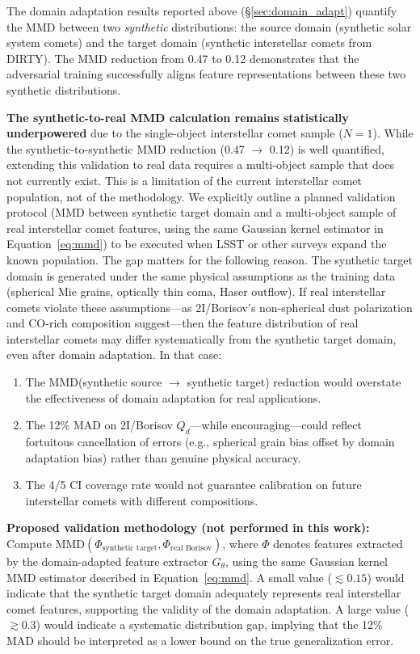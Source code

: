 \documentclass[preprint2]{aastex631}
\begin{document}
The domain adaptation results reported above (\S\ref{sec:domain_adapt}) quantify the MMD between two \textit{synthetic} distributions: the source domain (synthetic solar system comets) and the target domain (synthetic interstellar comets from DIRTY). The MMD reduction from 0.47 to 0.12 demonstrates that the adversarial training successfully aligns feature representations between these two synthetic distributions.

\textbf{The synthetic-to-real MMD calculation remains statistically underpowered} due to the single-object interstellar comet sample ($N=1$). While the synthetic-to-synthetic MMD reduction (0.47 $\to$ 0.12) is well quantified, extending this validation to real data requires a multi-object sample that does not currently exist. This is a limitation of the current interstellar comet population, not of the methodology. We explicitly outline a planned validation protocol (MMD between synthetic target domain and a multi-object sample of real interstellar comet features, using the same Gaussian kernel estimator in Equation~\ref{eq:mmd}) to be executed when LSST or other surveys expand the known population. The gap matters for the following reason. The synthetic target domain is generated under the same physical assumptions as the training data (spherical Mie grains, optically thin coma, Haser outflow). If real interstellar comets violate these assumptions---as 2I/Borisov's non-spherical dust polarization \citep{bagnulo22} and CO-rich composition \citep{bodewits20} suggest---then the feature distribution of real interstellar comets may differ systematically from the synthetic target domain, even after domain adaptation. In that case:

\begin{enumerate}
    \item The MMD(synthetic source $\to$ synthetic target) reduction would overstate the effectiveness of domain adaptation for real applications.
    \item The 12\% MAD on 2I/Borisov $Q_d$---while encouraging---could reflect fortuitous cancellation of errors (e.g., spherical grain bias offset by domain adaptation bias) rather than genuine physical accuracy.
    \item The 4/5 CI coverage rate would not guarantee calibration on future interstellar comets with different compositions.
\end{enumerate}

\textbf{Proposed validation methodology (not performed in this work):} Compute $\text{MMD}(\Phi_{\text{synthetic target}}, \Phi_{\text{real Borisov}})$, where $\Phi$ denotes features extracted by the domain-adapted feature extractor $G_\theta$, using the same Gaussian kernel MMD estimator described in Equation~\ref{eq:mmd}. A small value ($\lesssim 0.15$) would indicate that the synthetic target domain adequately represents real interstellar comet features, supporting the validity of the domain adaptation. A large value ($\gtrsim 0.3$) would indicate a systematic distribution gap, implying that the 12\% MAD should be interpreted as a lower bound on the true generalization error.
\end{document}
